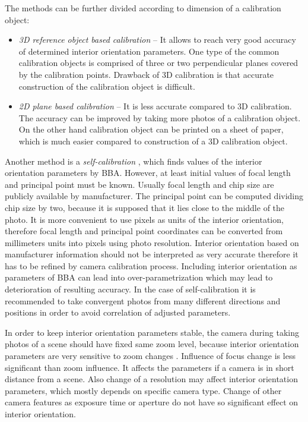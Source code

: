 \documentclass[a4paper,12pt]{article}
\newcommand{\term}[1]{%
{\it #1}%
}
\begin{document}
The methods can be further divided according to dimension of a calibration object:


\begin{itemize}
\item \term{3D reference object based calibration} -- It allows to reach very good accuracy of determined 
interior orientation parameters. One type of the common calibration objects is comprised of three or two
perpendicular planes covered by the calibration points. Drawback of 3D calibration 
is that accurate construction of the calibration object is difficult.
\item \term{2D plane based calibration} -- It is less accurate compared to 3D calibration. 
The accuracy can be improved by taking more photos of a calibration object.
On the other hand calibration object can be printed on a sheet of paper, which is much 
easier compared to construction of a 3D calibration object.
\end{itemize}


Another method is a \term{self-calibration}, which finds values of the interior orientation parameters by BBA.
However, at least initial values of focal length and principal point must be known.
Usually focal length and chip size are publicly available by manufacturer. The principal point 
can be computed dividing chip size by two, because it is supposed that it lies close to 
the middle of the photo.
It is more convenient to use 
pixels as units of the interior orientation, therefore focal length and principal point coordinates can be 
converted from millimeters units into pixels using photo resolution. 
Interior orientation based on manufacturer information should not be interpreted as very accurate therefore 
it has  to be refined by camera calibration process.
Including interior orientation as parameters of BBA
can lead into over-parametrization which may lead to deterioration of resulting accuracy.
In the case of self-calibration it is recommended to take convergent photos from many different directions and positions in order
to avoid correlation of adjusted parameters. 


In order to keep interior orientation parameters stable, the camera during taking photos of a scene should have fixed same zoom level,
because interior orientation parameters are very sensitive to zoom changes \cite{labe2004geometric}.
Influence of focus change is less significant than zoom influence. It affects the parameters if a camera is in short distance
 from a scene.
Also change of a resolution may affect interior orientation parameters, which mostly depends 
on specific camera type. 
Change of other camera features as exposure time or aperture do not have so significant effect on interior
orientation.
\end{document}
